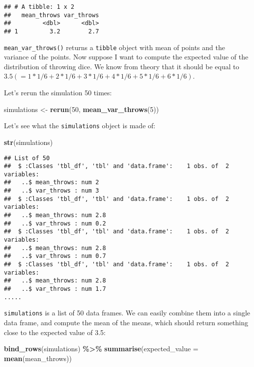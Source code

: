 \documentclass[
]{article}
\newenvironment{Shaded}{\begin{snugshade}}{\end{snugshade}}
\newcommand{\DataTypeTok}[1]{\textcolor[rgb]{0.13,0.29,0.53}{#1}}
\newcommand{\DecValTok}[1]{\textcolor[rgb]{0.00,0.00,0.81}{#1}}
\newcommand{\KeywordTok}[1]{\textcolor[rgb]{0.13,0.29,0.53}{\textbf{#1}}}
\newcommand{\NormalTok}[1]{#1}
\newcommand{\OperatorTok}[1]{\textcolor[rgb]{0.81,0.36,0.00}{\textbf{#1}}}
\newcommand{\StringTok}[1]{\textcolor[rgb]{0.31,0.60,0.02}{#1}}
\begin{document}
\begin{verbatim}
## # A tibble: 1 x 2
##   mean_throws var_throws
##         <dbl>      <dbl>
## 1         3.2        2.7
\end{verbatim}

\texttt{mean\_var\_throws()} returns a \texttt{tibble} object with mean of points and the variance of the points. Now suppose
I want to compute the expected value of the distribution of throwing dice. We know from theory that it should
be equal to \(3.5 (= 1*1/6 + 2*1/6 + 3*1/6 + 4*1/6 + 5*1/6 + 6*1/6)\).

Let's rerun the simulation 50 times:

\begin{Shaded}
\begin{Highlighting}[]
\NormalTok{simulations \textless{}{-}}\StringTok{ }\KeywordTok{rerun}\NormalTok{(}\DecValTok{50}\NormalTok{, }\KeywordTok{mean\_var\_throws}\NormalTok{(}\DecValTok{5}\NormalTok{))}
\end{Highlighting}
\end{Shaded}

Let's see what the \texttt{simulations} object is made of:

\begin{Shaded}
\begin{Highlighting}[]
\KeywordTok{str}\NormalTok{(simulations)}
\end{Highlighting}
\end{Shaded}

\begin{verbatim}
## List of 50
##  $ :Classes 'tbl_df', 'tbl' and 'data.frame':    1 obs. of  2 variables:
##   ..$ mean_throws: num 2
##   ..$ var_throws : num 3
##  $ :Classes 'tbl_df', 'tbl' and 'data.frame':    1 obs. of  2 variables:
##   ..$ mean_throws: num 2.8
##   ..$ var_throws : num 0.2
##  $ :Classes 'tbl_df', 'tbl' and 'data.frame':    1 obs. of  2 variables:
##   ..$ mean_throws: num 2.8
##   ..$ var_throws : num 0.7
##  $ :Classes 'tbl_df', 'tbl' and 'data.frame':    1 obs. of  2 variables:
##   ..$ mean_throws: num 2.8
##   ..$ var_throws : num 1.7
.....
\end{verbatim}

\texttt{simulations} is a list of 50 data frames. We can easily combine them into a single data frame, and compute the
mean of the means, which should return something close to the expected value of 3.5:

\begin{Shaded}
\begin{Highlighting}[]
\KeywordTok{bind\_rows}\NormalTok{(simulations) }\OperatorTok{\%\textgreater{}\%}
\StringTok{  }\KeywordTok{summarise}\NormalTok{(}\DataTypeTok{expected\_value =} \KeywordTok{mean}\NormalTok{(mean\_throws))}
\end{Highlighting}
\end{Shaded}
\end{document}
